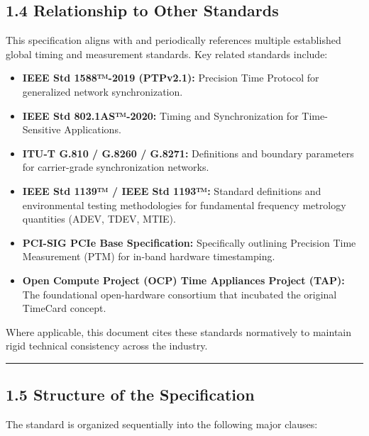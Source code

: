 \subsection{1.4 Relationship to Other
Standards}\label{relationship-to-other-standards}

This specification aligns with and periodically references multiple
established global timing and measurement standards. Key related
standards include:

\begin{itemize}
\tightlist
\item
  \textbf{IEEE Std 1588™-2019 (PTPv2.1):} Precision Time Protocol for
  generalized network synchronization.
\item
  \textbf{IEEE Std 802.1AS™-2020:} Timing and Synchronization for
  Time-Sensitive Applications.
\item
  \textbf{ITU-T G.810 / G.8260 / G.8271:} Definitions and boundary
  parameters for carrier-grade synchronization networks.
\item
  \textbf{IEEE Std 1139™ / IEEE Std 1193™:} Standard definitions and
  environmental testing methodologies for fundamental frequency
  metrology quantities (ADEV, TDEV, MTIE).
\item
  \textbf{PCI-SIG PCIe Base Specification:} Specifically outlining
  Precision Time Measurement (PTM) for in-band hardware timestamping.
\item
  \textbf{Open Compute Project (OCP) Time Appliances Project (TAP):} The
  foundational open-hardware consortium that incubated the original
  TimeCard concept.
\end{itemize}

Where applicable, this document cites these standards normatively to
maintain rigid technical consistency across the industry.

\begin{center}\rule{0.5\linewidth}{0.5pt}\end{center}

\subsection{1.5 Structure of the
Specification}\label{structure-of-the-specification}

The standard is organized sequentially into the following major clauses:

